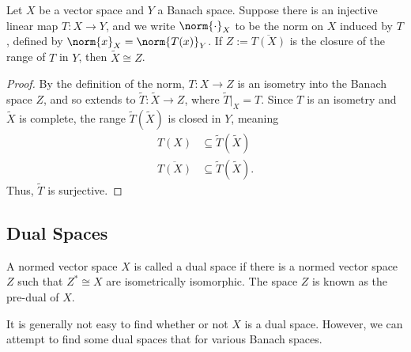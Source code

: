 \documentclass[10pt]{mypackage}
\begin{document}
\begin{corollary}
  Let $X$ be a vector space and $Y$ a Banach space. Suppose there is an injective linear map $T: X\rightarrow Y$, and we write $\norm{\cdot}_X$ to be the norm on $X$ induced by $T$, defined by $\norm{x}_X = \norm{T(x)}_Y$. If $Z:=\overline{T(X)}$ is the closure of the range of $T$ in $Y$, then $\widetilde{X} \cong Z$.
\end{corollary}
\begin{proof}
  By the definition of the norm, $T: X\rightarrow Z$ is an isometry into the Banach space $Z$, and so extends to $\widetilde{T}: \widetilde{X}\rightarrow Z$, where $\widetilde{T}|_{X} = T$. Since $T$ is an isometry and $\widetilde{X}$ is complete, the range $\widetilde{T}\left(\widetilde{X}\right)$ is closed in $Y$, meaning
  \begin{align*}
    T(X) &\subseteq \widetilde{T}\left(\widetilde{X}\right)\\
    \overline{T(X)} &\subseteq \widetilde{T}\left(\widetilde{X}\right).
  \end{align*}
  Thus, $\widetilde{T}$ is surjective.
\end{proof}
\subsection{Dual Spaces}%
\begin{definition}
  A normed vector space $X$ is called a dual space if there is a normed vector space $Z$ such that $Z^{\ast}\cong X$ are isometrically isomorphic. The space $Z$ is known as the pre-dual of $X$.
\end{definition}
It is generally not easy to find whether or not $X$ is a dual space. However, we can attempt to find some dual spaces that for various Banach spaces.\newline
\end{document}
